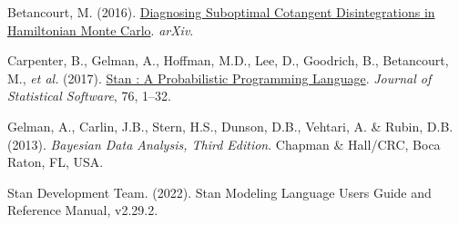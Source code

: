 \documentclass[
  11pt,
  letterpaper,
  DIV=11,
  numbers=noendperiod]{scrartcl}
\newlength{\cslhangindent}
\newlength{\cslentryspacingunit} %
\newenvironment{CSLReferences}[2] %
 {%
  \setlength{\parindent}{0pt}
  \ifodd #1
  \let\oldpar\par
  \def\par{\hangindent=\cslhangindent\oldpar}
  \fi
  \setlength{\parskip}{#2\cslentryspacingunit}
 }%
 {}
\begin{document}
\hypertarget{refs}{}
\begin{CSLReferences}{1}{0}
\leavevmode{}%
Betancourt, M. (2016).
\href{https://doi.org/10.48550/arXiv.1604.00695}{Diagnosing {Suboptimal
Cotangent Disintegrations} in {Hamiltonian Monte Carlo}}. \emph{arXiv}.

\leavevmode{}%
Carpenter, B., Gelman, A., Hoffman, M.D., Lee, D., Goodrich, B.,
Betancourt, M., \emph{et al.} (2017).
\href{https://doi.org/10.18637/jss.v076.i01}{Stan : {A Probabilistic
Programming Language}}. \emph{Journal of Statistical Software}, 76,
1--32.

\leavevmode{}%
Gelman, A., Carlin, J.B., Stern, H.S., Dunson, D.B., Vehtari, A. \&
Rubin, D.B. (2013). \emph{Bayesian {Data Analysis}, {Third Edition}}.
{Chapman \& Hall/CRC}, {Boca Raton, FL, USA.}

\leavevmode{}%
Stan Development Team. (2022). Stan {Modeling Language Users Guide} and
{Reference Manual}, v2.29.2.

\end{CSLReferences}
\end{document}
